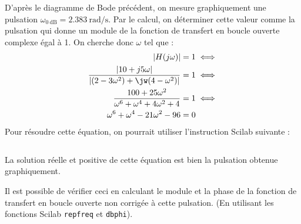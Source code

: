 D'après le diagramme de Bode précédent, on mesure graphiquement une pulsation
$\omega_{\SI{0}{\dB}}=\SI{2.383}{\radian\per\second}$.
Par le calcul, on déterminer cette valeur comme la pulsation qui donne un 
module de la fonction de transfert en boucle ouverte complexe égal à 1.
On cherche donc $\omega$ tel que :
\begin{align*}
    |H(j\omega)|=1 &\iff \\
    \dfrac{|10+j5\omega|}{|(2-3\omega^2)+\jw(4-\omega^2)|}=1 &\iff \\
    \dfrac{100+25\omega^2}{\omega^6+\omega^4+4\omega^2+4}=1 &\iff \\
    \omega^6+\omega^4-21\omega^2-96=0
\end{align*}
Pour résoudre cette équation, on pourrait utiliser l'instruction Scilab 
suivante :
\inputminted{scilab}{codes/scilab/code_q2_1_chap_correction.sce}
La solution réelle et positive de cette équation est bien la pulsation obtenue
graphiquement.

Il est possible de vérifier ceci en calculant le module et la phase de la 
fonction de transfert en boucle ouverte non corrigée à cette pulsation. 
(En utilisant les fonctions Scilab \texttt{repfreq} et \texttt{dbphi}). 
\inputminted{scilab}{codes/scilab/code_q2_2_chap_correction.sce}

